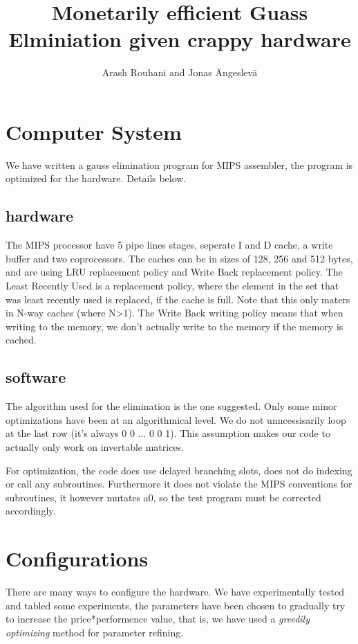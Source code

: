 \documentclass[a4paper,11pt]{article}
\title{Monetarily efficient Guass Elminiation given crappy hardware}
\author{Arash Rouhani and Jonas Ängeslevä}
\begin{document}
\maketitle

\section{Computer System}
We have written a gauss elimination program for MIPS assembler, the program is optimized for the hardware. Details below.
\subsection{hardware}
The MIPS processor have 5 pipe lines stages, seperate I and D cache, a write buffer and two coprocessors.
The caches can be in sizes of 128, 256 and 512 bytes, and are using LRU replacement policy and Write Back replacement policy.
The Least Recently Used is a replacement policy, where the element in the set that was least recently used is replaced, if the cache is full. Note that this only maters in N-way caches (where N>1).
The Write Back writing policy means that when writing to the memory, we don't actually write to the memory if the memory is cached. 
\subsection{software}
The algorithm used for the elimination is the one suggested.
Only some minor optimizations have been at an algorithmical level. We do not unncessisarily loop at the last row (it's always 0 0 ... 0 0 1).
This assumption makes our code to actually only work on invertable matrices.

For optimization, the code does use delayed branching slots, does not do indexing or call any subroutines. 
Furthermore it does not violate the MIPS conventions for subroutines, it however mutates a0, so the test program must be corrected accordingly.
\section{Configurations}
There are many ways to configure the hardware. We have experimentally tested and tabled some experiments, the parameters have been chosen to gradually try to increase the price*performence value, that is, we have used a \emph{greedily optimizing} method for parameter refining.
\end{document}
